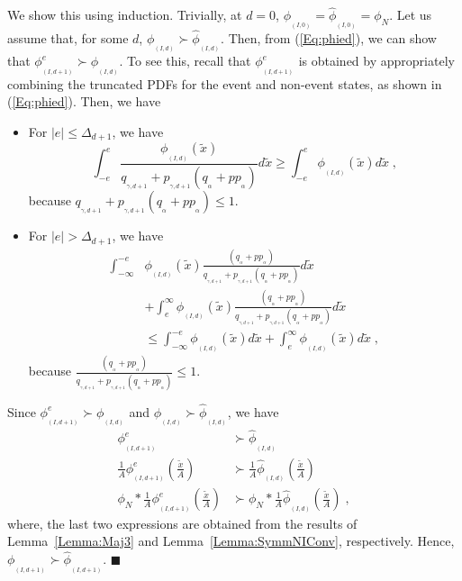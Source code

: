 \documentclass[twocolumn]{autart}
\newenvironment{proof}[1][Proof]{\begin{trivlist}
\item[\hskip \labelsep {\bfseries #1}]}{\end{trivlist}}
\renewcommand{\qed}{$\blacksquare$}
\begin{document}
\begin{proof}
We show this using induction. Trivially, at $d=0$, $\phi_{_{(I,0)}} = \hat{\phi}_{_{(I,0)}} = \phi_N$. Let us assume that, for some $d$, $\phi_{_{(I,d)}} \succ \hat{\phi}_{_{(I,d)}}$. Then, from (\ref{Eq:phied}), we can show that $\phi^e_{_{(I,d+1)}} \succ \phi_{_{(I,d)}}$. To see this, recall that $\phi^e_{_{(I,d+1)}}$ is obtained by appropriately combining the truncated PDFs for the event and non-event states, as shown in (\ref{Eq:phied}). Then, we have
\begin{itemize}
\item For $|e| \le \Delta_{d+1}$, we have
\begin{equation*}
\int_{-e}^{e} \frac{\phi_{_{(I,d)}}(\tilde{x})}{q_{_{\gamma,d+1}}+p_{_{\gamma,d+1}}(q_{_{\alpha}} + p p_{_{\alpha}})} d \tilde{x} \ge \int_{-e}^{e} \phi_{_{(I,d)}}(\tilde{x}) d \tilde{x} \; ,
\end{equation*}
because $q_{_{\gamma,d+1}}+p_{_{\gamma,d+1}}(q_{_{\alpha}} + p p_{_{\alpha}}) \le 1$.
\item For $|e| > \Delta_{d+1}$, we have
\begin{align*}
\int_{-\infty}^{-e} &\phi_{_{(I,d)}} (\tilde{x}) \frac{(q_{_{\alpha}} + p p_{_{\alpha}})}{q_{_{\gamma,d+1}} + p_{_{\gamma,d+1}}(q_{_{\alpha}} + p p_{_{\alpha}})} d \tilde{x} \\
&+ \int_{e}^{\infty} \phi_{_{(I,d)}}(\tilde{x}) \frac{(q_{_{\alpha}} + p p_{_{\alpha}})}{q_{_{\gamma,d+1}} + p_{_{\gamma,d+1}}(q_{_{\alpha}} + p p_{_{\alpha}})} d \tilde{x} \\
&\le \int_{-\infty}^{-e} \phi_{_{(I,d)}}(\tilde{x}) d \tilde{x} + \int_{e}^{\infty} \phi_{_{(I,d)}}(\tilde{x}) d \tilde{x} \; ,
\end{align*}
because $\frac{(q_{_{\alpha}} + p p_{_{\alpha}})}{q_{_{\gamma,d+1}} + p_{_{\gamma,d+1}}(q_{_{\alpha}} + p p_{_{\alpha}})} \le 1$.
\end{itemize}

Since $\phi^e_{_{(I,d+1)}} \succ \phi_{_{(I,d)}}$ and $\phi_{_{(I,d)}} \succ \hat{\phi}_{_{(I,d)}}$, we have
\begin{align*}
\phi^e_{_{(I,d+1)}} &\succ \hat{\phi}_{_{(I,d)}} \\
\frac{1}{A} \phi^e_{_{(I,d+1)}}(\frac{\tilde{x}}{A}) &\succ \frac{1}{A} \hat{\phi}_{_{(I,d)}}(\frac{\tilde{x}}{A}) \\
\phi_N \ast \frac{1}{A} \phi^e_{_{(I,d+1)}}(\frac{\tilde{x}}{A}) &\succ \phi_N \ast \frac{1}{A} \hat{\phi}_{_{(I,d)}}(\frac{\tilde{x}}{A}) \; ,
\end{align*}
where, the last two expressions are obtained from the results of Lemma~\ref{Lemma:Maj3} and Lemma~\ref{Lemma:SymmNIConv}, respectively. Hence, $\phi_{_{(I,d+1)}} \succ \hat{\phi}_{_{(I,d+1)}}$. \hfill \qed
\end{proof}
\end{document}
